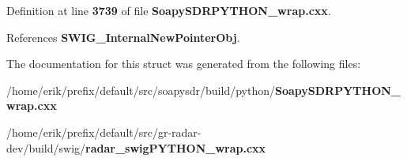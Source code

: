 Definition at line {\bf 3739} of file {\bf Soapy\+S\+D\+R\+P\+Y\+T\+H\+O\+N\+\_\+wrap.\+cxx}.



References {\bf S\+W\+I\+G\+\_\+\+Internal\+New\+Pointer\+Obj}.



The documentation for this struct was generated from the following files\+:\begin{DoxyCompactItemize}
\item 
/home/erik/prefix/default/src/soapysdr/build/python/{\bf Soapy\+S\+D\+R\+P\+Y\+T\+H\+O\+N\+\_\+wrap.\+cxx}\item 
/home/erik/prefix/default/src/gr-\/radar-\/dev/build/swig/{\bf radar\+\_\+swig\+P\+Y\+T\+H\+O\+N\+\_\+wrap.\+cxx}\end{DoxyCompactItemize}
